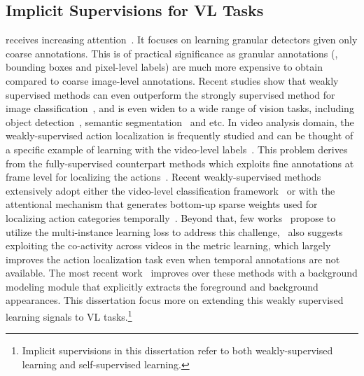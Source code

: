 \subsection{Implicit Supervisions for VL Tasks}
 receives increasing attention~\citep{deselaers2010localizing,pandey2011scene, cinbis2017weakly,mahajan2018exploring,pathak2015constrained,pinheiro2015image,xu2014tell}.
It focuses on learning granular detectors given only coarse annotations.
This is of practical significance as granular annotations (\eg, bounding boxes and pixel-level labels) are much more expensive to obtain compared to coarse image-level annotations.
Recent studies show that weakly supervised methods can even outperform the strongly supervised method for image classification~\citep{mahajan2018exploring,ge2019weakly},
and is even widen to a wide range of vision tasks, including object detection~\citep{bilen2014weakly,shen2018generative,bilen2016weakly}, semantic segmentation~\citep{kervadec2019constrained,pathak2015constrained,wei2016stc} and etc.
In video analysis domain, the weakly-supervised action localization is frequently studied and can be thought of a specific example of learning with the video-level labels~\citep{sun2015temporal,shou2018autoloc,nguyen2018weakly,paul2018w}.
This problem derives from the fully-supervised counterpart methods which exploits fine annotations at frame level
for localizing the actions~\citep{buch2017sst,kalogeiton2017action,weinzaepfel2015learning,shou2017cdc,tran2012max,shou2016temporal}.
Recent weakly-supervised methods extensively adopt either the video-level classification framework~\citep{singh2017hide,shou2018autoloc,sikka2014classification,dwibedi2019temporal} or with the attentional mechanism 
that generates bottom-up sparse weights used for localizing action categories temporally~\citep{nguyen2018weakly}. Beyond that, few works~\citep{wang2017untrimmednets,paul2018w} propose to utilize the multi-instance learning loss to address this challenge,~\citep{paul2018w} also suggests exploiting the co-activity across videos in the metric learning, which largely improves the action localization task even when temporal annotations are not available. The most recent work~\citep{nguyen2019weakly} improves over these methods with a background modeling module that explicitly extracts the foreground and background appearances.  This dissertation focus more on extending this weakly supervised learning signals to VL tasks.\footnote{Implicit supervisions in this dissertation refer to both weakly-supervised learning and self-supervised learning.}

